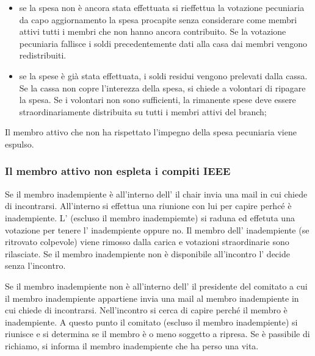 \documentclass[pdf]{article}
\theoremstyle{definition}
\begin{document}
\begin{itemize}
	\item se la spesa non è ancora stata effettuata si rieffettua la votazione pecuniaria da capo aggiornamento la spesa procapite senza considerare come membri attivi tutti i membri che non hanno ancora contribuito. Se la votazione pecuniaria fallisce i soldi precedentemente dati alla casa dai membri vengono redistribuiti.
	\item se la spese è già stata effettuata, i soldi residui vengono prelevati dalla cassa. Se la cassa non copre l'interezza della spesa, si chiede a volontari di ripagare la spesa. Se i volontari non sono sufficienti, la rimanente spese deve essere straordinariamente distribuita su tutti i membri attivi del branch;
\end{itemize}

Il membro attivo che non ha rispettato l'impegno della spesa pecuniaria viene espulso.

\subsubsection{Il membro attivo non espleta i compiti IEEE}


Se il membro inadempiente è all'interno dell'\EC{} il chair invia una mail in cui chiede di incontrarsi. All'interno si effettua una riunione con lui per capire perhcé è inadempiente. L'\EC{} (escluso il membro inadempiemte) si raduna ed effetuta una votazione per tenere l'\EC{} inadempiente oppure no. Il membro dell'\EC{} inadempiente (se ritrovato colpevole) viene rimosso dalla carica e votazioni straordinarie sono rilasciate. Se il membro inadempiente non è disponibile all'incontro l'\EC{} decide senza l'incontro.


Se il membro inadempiente non è all'interno dell'\EC{} il presidente del comitato a cui il membro inadempiente appartiene invia una mail al membro inadempiente in cui chiede di incontrarsi. Nell'incontro si cerca di capire perché il membro è inadempiente. A questo punto il comitato (escluso il membro inadempiente) si riunisce e si determina se il membro è o meno soggetto a ripresa. Se è passibile di richiamo, si informa il membro inadempiente che ha perso una vita.
\end{document}

